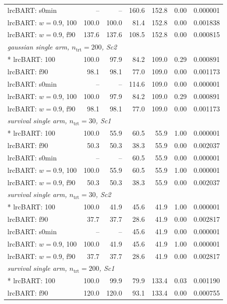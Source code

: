 \begin{longtable}{lrrrrrr}
lrcBART: s0min & -- & -- & 160.6 & 152.8 & 0.00 & 0.000001 \\
lrcBART: $w=0.9$, 100 & 100.0 & 100.0 & 81.4 & 152.8 & 0.00 & 0.001838 \\
lrcBART: $w=0.9$, f90 & 137.6 & 137.6 & 108.5 & 152.8 & 0.00 & 0.000815 \\
\multicolumn{7}{l}{\strut\textit{gaussian single arm, $n_{\mathrm{trt}}=200$, Sc2}}\\*
lrcBART: 100 & 100.0 & 97.9 & 84.2 & 109.0 & 0.29 & 0.000891 \\
lrcBART: f90 & 98.1 & 98.1 & 77.0 & 109.0 & 0.00 & 0.001173 \\
lrcBART: s0min & -- & -- & 114.6 & 109.0 & 0.00 & 0.000001 \\
lrcBART: $w=0.9$, 100 & 100.0 & 97.9 & 84.2 & 109.0 & 0.29 & 0.000891 \\
lrcBART: $w=0.9$, f90 & 98.1 & 98.1 & 77.0 & 109.0 & 0.00 & 0.001173 \\
\multicolumn{7}{l}{\strut\textit{survival single arm, $n_{\mathrm{trt}}=30$, Sc1}}\\*
lrcBART: 100 & 100.0 & 55.9 & 60.5 & 55.9 & 1.00 & 0.000001 \\
lrcBART: f90 & 50.3 & 50.3 & 38.3 & 55.9 & 0.00 & 0.002037 \\
lrcBART: s0min & -- & -- & 60.5 & 55.9 & 0.00 & 0.000001 \\
lrcBART: $w=0.9$, 100 & 100.0 & 55.9 & 60.5 & 55.9 & 1.00 & 0.000001 \\
lrcBART: $w=0.9$, f90 & 50.3 & 50.3 & 38.3 & 55.9 & 0.00 & 0.002037 \\
\multicolumn{7}{l}{\strut\textit{survival single arm, $n_{\mathrm{trt}}=30$, Sc2}}\\*
lrcBART: 100 & 100.0 & 41.9 & 45.6 & 41.9 & 1.00 & 0.000001 \\
lrcBART: f90 & 37.7 & 37.7 & 28.6 & 41.9 & 0.00 & 0.002817 \\
lrcBART: s0min & -- & -- & 45.6 & 41.9 & 0.00 & 0.000001 \\
lrcBART: $w=0.9$, 100 & 100.0 & 41.9 & 45.6 & 41.9 & 1.00 & 0.000001 \\
lrcBART: $w=0.9$, f90 & 37.7 & 37.7 & 28.6 & 41.9 & 0.00 & 0.002817 \\
\multicolumn{7}{l}{\strut\textit{survival single arm, $n_{\mathrm{trt}}=200$, Sc1}}\\*
lrcBART: 100 & 100.0 & 99.9 & 79.9 & 133.4 & 0.03 & 0.001190 \\
lrcBART: f90 & 120.0 & 120.0 & 93.1 & 133.4 & 0.00 & 0.000755 \\

\end{longtable}
